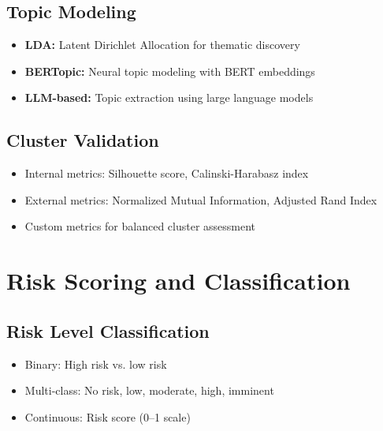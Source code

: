 \documentclass[12pt,a4paper]{article}
\begin{document}
\subsection{Topic Modeling}
\begin{itemize}
    \item \textbf{LDA:} Latent Dirichlet Allocation for thematic discovery
    \item \textbf{BERTopic:} Neural topic modeling with BERT embeddings
    \item \textbf{LLM-based:} Topic extraction using large language models
\end{itemize}

\subsection{Cluster Validation}
\begin{itemize}
    \item Internal metrics: Silhouette score, Calinski-Harabasz index
    \item External metrics: Normalized Mutual Information, Adjusted Rand Index
    \item Custom metrics for balanced cluster assessment
\end{itemize}

\section{Risk Scoring and Classification}

\subsection{Risk Level Classification}
\begin{itemize}
    \item Binary: High risk vs. low risk
    \item Multi-class: No risk, low, moderate, high, imminent
    \item Continuous: Risk score (0--1 scale)
\end{itemize}
\end{document}
